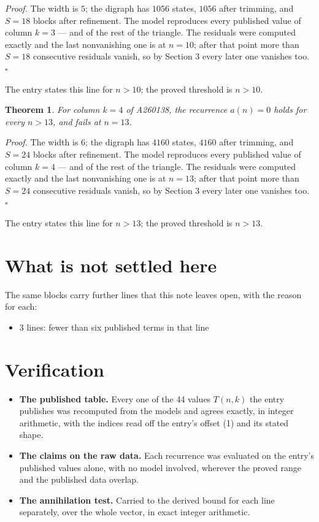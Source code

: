 \documentclass[11pt]{article}
\newtheorem{theorem}{Theorem}
\theoremstyle{definition}
\begin{document}
{\itshape Proof.} The width is $5$; the digraph has $1056$ states, $1056$ after trimming, and $S = 18$ blocks after refinement. The model reproduces every published value of column $k = 3$ --- and of the rest of the triangle. The residuals were computed exactly and the last nonvanishing one is at $n = 10$; after that point more than $S = 18$ consecutive residuals vanish, so by Section 3 every later one vanishes too. $\square$

The entry states this line for $n > 10$; the proved threshold is $n > 10$.

\begin{theorem} For column $k = 4$ of A260138, the recurrence $a(n) = 0$ holds for every $n > 13$, and fails at $n = 13$.\end{theorem}

{\itshape Proof.} The width is $6$; the digraph has $4160$ states, $4160$ after trimming, and $S = 24$ blocks after refinement. The model reproduces every published value of column $k = 4$ --- and of the rest of the triangle. The residuals were computed exactly and the last nonvanishing one is at $n = 13$; after that point more than $S = 24$ consecutive residuals vanish, so by Section 3 every later one vanishes too. $\square$

The entry states this line for $n > 13$; the proved threshold is $n > 13$.

\section{What is not settled here}

The same blocks carry further lines that this note leaves open, with the reason for each:

\begin{itemize}

\item 3 lines: fewer than six published terms in that line

\end{itemize}

\section{Verification}

\begin{itemize}

\item {\bfseries The published table.} Every one of the 44 values $T(n,k)$ the entry publishes was recomputed from the models and agrees exactly, in integer arithmetic, with the indices read off the entry's offset (1) and its stated shape.

\item {\bfseries The claims on the raw data.} Each recurrence was evaluated on the entry's published values alone, with no model involved, wherever the proved range and the published data overlap.

\item {\bfseries The annihilation test.} Carried to the derived bound for each line separately, over the whole vector, in exact integer arithmetic.

\end{itemize}
\end{document}
